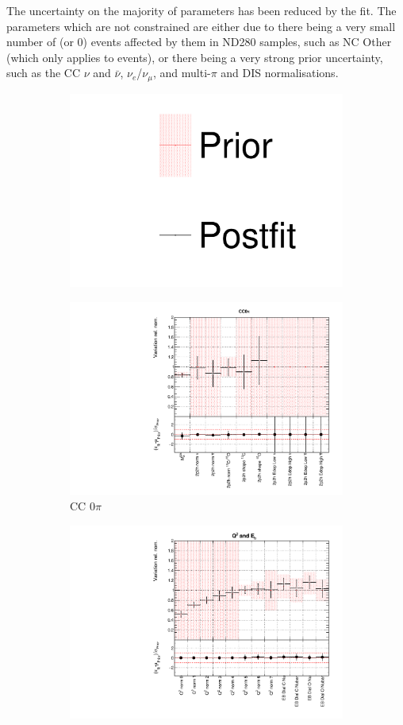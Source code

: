 The uncertainty on the majority of parameters has been reduced by the fit. The parameters which are not constrained are either due to there being a very small number of (or 0) events affected by them in ND280 samples, such as NC Other \SK (which only applies to \SK events), or there being a very strong prior uncertainty, such as the CC $\nu$ and $\bar{\nu}$, $\nu_e$/$\nu_{\mu}$, and multi-$\pi$ and DIS normalisations.

\begin{figure}[!htbp]
\centering
\begin{subfigure}{0.8\textwidth}
  \centering
  \includegraphics[width=0.25\linewidth]{figs/asmv_leg}
\end{subfigure}
\begin{subfigure}{0.49\textwidth}
  \centering
  \includegraphics[width=0.9\linewidth]{figs/asmvxsecpoly1}
  \caption{CC 0$\pi$}
\end{subfigure}
\begin{subfigure}{0.49\textwidth}
  \centering
  \includegraphics[width=0.9\linewidth]{figs/asmvxsecpoly2}

\end{subfigure}
\end{figure}
